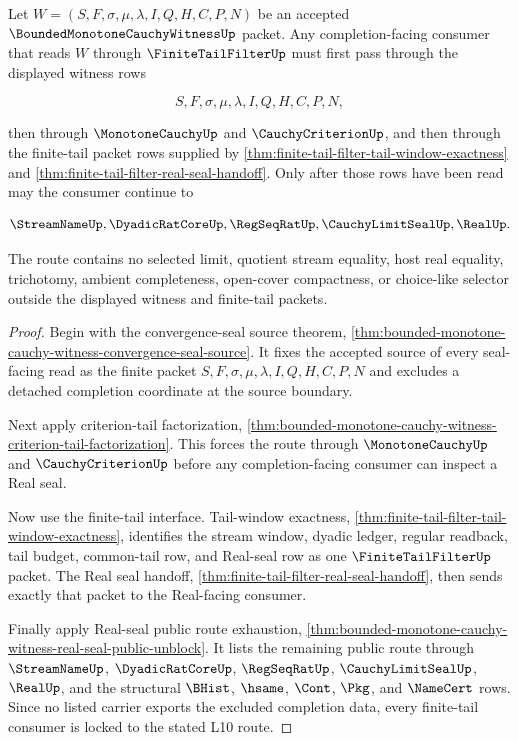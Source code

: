 \begin{theorem}
\label{thm:bounded-monotone-cauchy-witness-tail-filter-lock}
Let $W=(S,F,\sigma,\mu,\lambda,I,Q,H,C,P,N)$ be an accepted $\BoundedMonotoneCauchyWitnessUp$ packet. Any completion-facing consumer that reads $W$ through $\FiniteTailFilterUp$ must first pass through the displayed witness rows

$$
S,F,\sigma,\mu,\lambda,I,Q,H,C,P,N,
$$

then through $\MonotoneCauchyUp$ and $\CauchyCriterionUp$, and then through the finite-tail packet rows supplied by \autoref{thm:finite-tail-filter-tail-window-exactness} and \autoref{thm:finite-tail-filter-real-seal-handoff}. Only after those rows have been read may the consumer continue to

$$
\StreamNameUp,\DyadicRatCoreUp,\RegSeqRatUp,\CauchyLimitSealUp,\RealUp.
$$

The route contains no selected limit, quotient stream equality, host real equality, trichotomy, ambient completeness, open-cover compactness, or choice-like selector outside the displayed witness and finite-tail packets.
\end{theorem}
\begin{proof}
Begin with the convergence-seal source theorem, \autoref{thm:bounded-monotone-cauchy-witness-convergence-seal-source}. It fixes the accepted source of every seal-facing read as the finite packet $S,F,\sigma,\mu,\lambda,I,Q,H,C,P,N$ and excludes a detached completion coordinate at the source boundary.

Next apply criterion-tail factorization, \autoref{thm:bounded-monotone-cauchy-witness-criterion-tail-factorization}. This forces the route through $\MonotoneCauchyUp$ and $\CauchyCriterionUp$ before any completion-facing consumer can inspect a Real seal.

Now use the finite-tail interface. Tail-window exactness, \autoref{thm:finite-tail-filter-tail-window-exactness}, identifies the stream window, dyadic ledger, regular readback, tail budget, common-tail row, and Real-seal row as one $\FiniteTailFilterUp$ packet. The Real seal handoff, \autoref{thm:finite-tail-filter-real-seal-handoff}, then sends exactly that packet to the Real-facing consumer.

Finally apply Real-seal public route exhaustion, \autoref{thm:bounded-monotone-cauchy-witness-real-seal-public-unblock}. It lists the remaining public route through $\StreamNameUp$, $\DyadicRatCoreUp$, $\RegSeqRatUp$, $\CauchyLimitSealUp$, $\RealUp$, and the structural $\BHist$, $\hsame$, $\Cont$, $\Pkg$, and $\NameCert$ rows. Since no listed carrier exports the excluded completion data, every finite-tail consumer is locked to the stated L10 route.
\end{proof}

